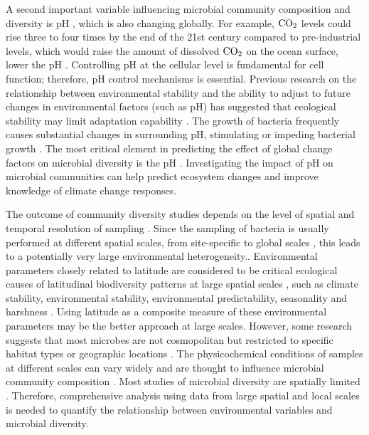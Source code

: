 \documentclass[11pt, a4paper]{article}
\begin{document}
\begin{spacing}{1.5}
A second important variable influencing microbial community composition and diversity is pH \citep{ratzke2018modifying}, which is also changing globally. For example, ${\rm CO_{2}}$ levels could rise three to four times by the end of the 21st century compared to pre-industrial levels, which would raise the amount of dissolved ${\rm CO_{2}}$ on the ocean surface, lower the pH \citep{orr2005anthropogenic}. Controlling pH at the cellular level is fundamental for cell function; therefore, pH control mechanisms is essential. Previous research on the relationship between environmental stability and the ability to adjust to future changes in environmental factors (such as pH) has suggested that ecological stability may limit adaptation capability \citep{somero2012physiology}. The growth of bacteria frequently causes substantial changes in surrounding pH, stimulating or impeding bacterial growth \citep{collins1987transfer, fu1999lactic, sole2000rapid}. The most critical element in predicting the effect of global change factors on microbial diversity is the pH \citep{zhou2020meta}. Investigating the impact of pH on microbial communities can help predict ecosystem changes and improve knowledge of climate change responses.

The outcome of community diversity studies depends on the level of spatial and temporal resolution of sampling  \citep{hunter2005marine}. Since the sampling of bacteria is usually performed at different spatial scales, from site-specific \citep{birgander2018responses} to global scales \citep{lozupone2007global, moran2015global, ye2019increasing}, this leads to a potentially very large environmental heterogeneity.. Environmental parameters closely related to latitude are considered to be critical ecological causes of latitudinal biodiversity patterns at large spatial scales \citep{mittelbach2007evolution, willig2013latitudinal}, such as climate stability, environmental stability, environmental predictability, seasonality and harshness \citep{kaufman1998structure, willig2013latitudinal}. Using latitude as a composite measure of these environmental parameters may be the better approach at large scales. However, some research suggests that most microbes are not cosmopolitan but restricted to specific habitat types or geographic locations \citep{hunter2005marine}. The physicochemical conditions of samples at different scales can vary widely and are thought to influence microbial community composition \citep{liu2020relationships}. Most studies of microbial diversity are spatially limited \citep{hanson2012beyond, martiny2006microbial, ramette2007biogeography, thompson2017communal}.  Therefore, comprehensive analysis using data from large spatial and local scales is needed to quantify the relationship between environmental variables and microbial diversity. 


\end{spacing}
\end{document}
